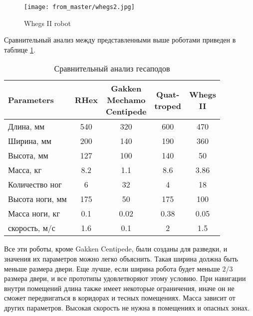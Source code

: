 \begin{figure}[H]
\centering\texttt{[image: from\_master/whegs2.jpg]}\\
\caption{Whegs II robot}
\label{fig:whegs}
\end{figure}

Сравнительный анализ между представленными выше роботами приведен в таблице \ref{tabular:robot_comparison}.
\begin{table}[H]
    \centering
\caption{Сравнительный анализ гесаподов}
\label{tabular:robot_comparison}
\begin{small}
\begin{tabular}{l|c|c|c|c}
\toprule
\toprule
\rowcolor{Gray}
 Parameters & RHex & \makecell{Gakken \\ Mechamo\\ Centipede} &  \makecell{Quat-\\troped} & \makecell{Whegs \\ II}\\
 \hline
Длина, мм & 540 & 320 & 600 & 470 \\ 
  \rowcolor{LightGray}
 Ширина, мм & 200 & 140 & 190 & 360 \\
 Высота, мм & 127 & 100 & 140 & 50 \\
  \rowcolor{LightGray}
 Масса, кг & 8.2 & 1.1 & 8.6 & 3.86 \\ 
 Количество ног & 6 & 32 & 4 & 18 \\
  \rowcolor{LightGray}
 Высота ноги, мм & 175 & 50 & 175 & 100  \\
 Масса ноги, кг & 0.1 & 0.02 & 0.38 & 0.05 \\
  \rowcolor{LightGray}
 скорость, м/с & 1.6 & 0.1 & 2 & 1.5 \\
\bottomrule
\bottomrule
\end{tabular}
\end{small}
\end{table}

Все эти роботы, кроме Gakken Centipede, были созданы для разведки, и значения их параметров можно легко объяснить. Такая ширина должна быть меньше размера двери. Еще лучше, если ширина робота будет меньше 2/3 размера двери, и все прототипы удовлетворяют этому условию. При навигации внутри помещений длина также имеет некоторые ограничения, иначе он не сможет передвигаться в коридорах и тесных помещениях. Масса зависит от других параметров. Высокая скорость не нужна в помещениях и опасных зонах. 

